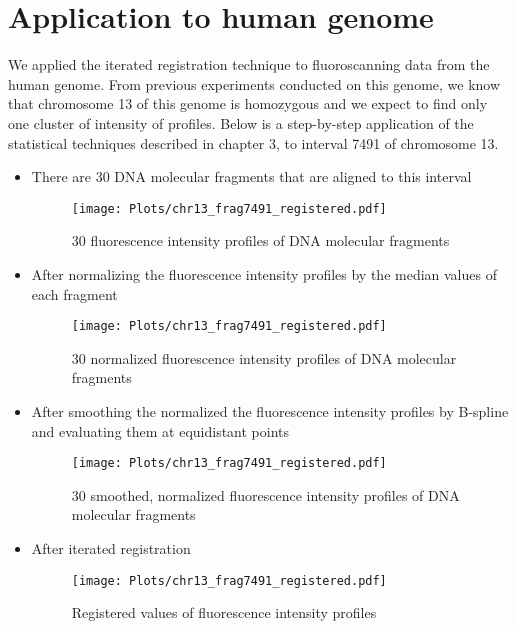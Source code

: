 \chapter{Application to human genome}

We applied the iterated registration technique to fluoroscanning data from the human genome. From previous experiments conducted on this genome, we know that chromosome 13 of this genome is homozygous and we expect to find only one cluster of intensity of profiles. Below is a step-by-step application of the statistical techniques described in chapter 3, to interval 7491 of chromosome 13.
\begin{itemize}
\item There are 30 DNA molecular fragments that are aligned to this interval
\begin{figure}[H]
\begin{center}
\texttt{[image: Plots/chr13\_frag7491\_registered.pdf]}
\end{center}
\caption{30 fluorescence intensity profiles of DNA molecular fragments}
\label{fig:Frag7491_Orig}
\end{figure}

\item After normalizing the fluorescence intensity profiles by the median values of each fragment
\begin{figure}[H]
\begin{center}
\texttt{[image: Plots/chr13\_frag7491\_registered.pdf]}
\end{center}
\caption{30 normalized fluorescence intensity profiles of DNA molecular fragments}
\label{fig:Frag7491_Norm}
\end{figure}

\item After smoothing the normalized the fluorescence intensity profiles by B-spline and evaluating them at equidistant points
\begin{figure}[H]
\begin{center}
\texttt{[image: Plots/chr13\_frag7491\_registered.pdf]}
\end{center}
\caption{30 smoothed, normalized fluorescence intensity profiles of DNA molecular fragments}
\label{fig:Frag7491_Smooth}
\end{figure}

\item After iterated registration
\begin{figure}[H]
\begin{center}
\texttt{[image: Plots/chr13\_frag7491\_registered.pdf]}
\end{center}
\caption{Registered values of fluorescence intensity profiles}
\label{fig:Frag7491_Regist}
\end{figure}


\end{itemize}
